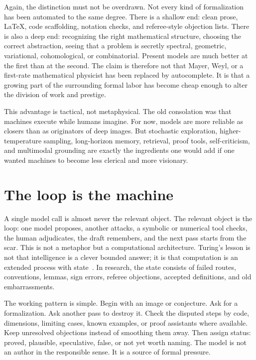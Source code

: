 \documentclass[
  aps,
  reprint,
  superscriptaddress,
  floatfix,
  nofootinbib,
  longbibliography
]{revtex4-2}
\begin{document}
Again, the distinction must not be overdrawn. Not every kind of formalization
has been automated to the same degree. There is a shallow end: clean prose,
\LaTeX, code scaffolding, notation checks, and referee-style objection lists.
There is also a deep end: recognizing the right mathematical structure, choosing
the correct abstraction, seeing that a problem is secretly spectral, geometric,
variational, cohomological, or combinatorial. Present models are much better at
the first than at the second. The claim is therefore not that Mayer, Weyl, or a
first-rate mathematical physicist has been replaced by autocomplete. It is that
a growing part of the surrounding formal labor has become cheap enough to alter
the division of work and prestige.

This advantage is tactical, not metaphysical. The old consolation was that
machines execute while humans imagine. For now, models are more reliable as
closers than as originators of deep images. But stochastic exploration,
higher-temperature sampling, long-horizon memory, retrieval, proof tools,
self-criticism, and multimodal grounding are exactly the ingredients one would
add if one wanted machines to become less clerical and more visionary.

\section{The loop is the machine}

A single model call is almost never the relevant object. The relevant object is
the loop: one model proposes, another attacks, a symbolic or numerical tool
checks, the human adjudicates, the draft remembers, and the next pass starts from
the scar. This is not a metaphor but a computational architecture. Turing's
lesson is not that intelligence is a clever bounded answer; it is that
computation is an extended process with state~\cite{turing-36}. In research, the
state consists of failed routes, conventions, lemmas, sign errors, referee
objections, accepted definitions, and old embarrassments.

The working pattern is simple. Begin with an image or conjecture. Ask for a
formalization. Ask another pass to destroy it. Check the disputed steps by code,
dimensions, limiting cases, known examples, or proof assistants where available.
Keep unresolved objections instead of smoothing them away. Then assign status:
proved, plausible, speculative, false, or not yet worth naming. The model is not
an author in the responsible sense. It is a source of formal pressure.
\end{document}
